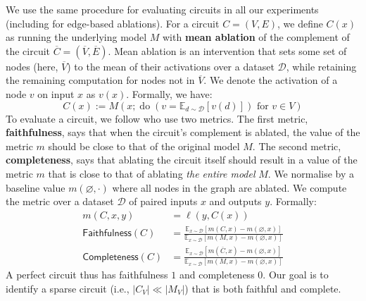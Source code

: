 \documentclass{article}
\theoremstyle{plain}
\theoremstyle{definition}
\theoremstyle{remark}
\begin{document}
We use the same procedure for evaluating circuits in all our experiments (including for edge-based ablations). For a circuit $C = (V, E)$, we define $C(x)$ as running the underlying model $M$ with \textbf{mean ablation} of the complement of the circuit $\overline{C} = (\overline{V}, \overline{E})$. Mean ablation is an intervention that sets some set of nodes (here, $\overline{V}$) to the mean of their activations over a dataset $\mathcal{D}$, while retaining the remaining computation for nodes not in $\overline{V}$. We denote the activation of a node $v$ on input $x$ as $v(x)$. Formally, we have:
\begin{equation}
\label{eq:mean-abl}
C(x) := M(x; \operatorname{do}(v = \mathbb{E}_{d \sim \mathcal{D}}[v(d)]) \text{ for } v \in V)
\end{equation}
To evaluate a circuit, we follow \citet{marks2025sparse,wang2022interpretability} who use two metrics.
The first metric, \textbf{faithfulness}, says that when the circuit's complement is ablated, the value of the metric $m$ should be close to that of the original model $M$. 
The second metric, \textbf{completeness}, says that ablating the circuit itself should result in a value of the metric $m$ that is close to that of ablating \textit{the entire model} $M$. 
We normalise by a baseline value $m(\varnothing, \cdot)$ where all nodes in the graph are ablated.
We compute the metric over a dataset $\mathcal{D}$ of paired inputs $x$ and outputs $y$.
Formally:
\begin{align}
m(C, x, y) &= \ell(y, C(x))\\
\mathsf{Faithfulness}(C) &= \frac{\mathbb{E}_{x \sim \mathcal{D}}[m(C, x) - m(\varnothing, x)]}{\mathbb{E}_{x \sim \mathcal{D}}[m(M, x) - m(\varnothing, x)]} \label{eq:faithfulness} \\
\mathsf{Completeness}(C) &= \frac{\mathbb{E}_{x \sim \mathcal{D}}[m(\overline{C}, x) - m(\varnothing, x)]}{\mathbb{E}_{x \sim \mathcal{D}}[m(M, x) - m(\varnothing, x)]}
\end{align}
A perfect circuit thus has faithfulness $1$ and completeness $0$. Our goal is to identify a sparse circuit (i.e., $\lvert C_V \rvert \ll \lvert M_V \rvert$) that is both faithful and complete.
\end{document}

